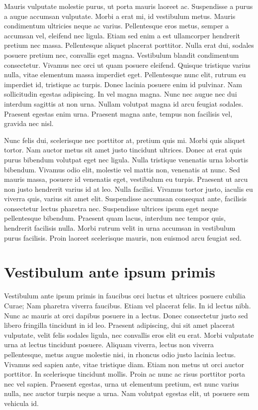 Mauris vulputate molestie purus, ut porta mauris laoreet ac.
Suspendisse a purus a augue accumsan vulputate.
Morbi a erat mi, id vestibulum metus.
Mauris condimentum ultricies neque ac varius.
Pellentesque eros metus, semper a accumsan vel, eleifend nec ligula.
Etiam sed enim a est ullamcorper hendrerit pretium nec massa.
Pellentesque aliquet placerat porttitor.
Nulla erat dui, sodales posuere pretium nec, convallis eget magna.
Vestibulum blandit condimentum consectetur.
Vivamus nec orci ut quam posuere eleifend.
Quisque tristique varius nulla, vitae elementum massa imperdiet eget.
Pellentesque nunc elit, rutrum eu imperdiet id, tristique ac turpis.
Donec lacinia posuere enim id pulvinar.
Nam sollicitudin egestas adipiscing.
In vel magna magna.
Nunc nec augue nec dui interdum sagittis at non urna.
Nullam volutpat magna id arcu feugiat sodales.
Praesent egestas enim urna.
Praesent magna ante, tempus non facilisis vel, gravida nec nisl.

Nunc felis dui, scelerisque nec porttitor at, pretium quis mi.
Morbi quis aliquet tortor.
Nam auctor metus sit amet justo tincidunt ultrices.
Donec at erat quis purus bibendum volutpat eget nec ligula.
Nulla tristique venenatis urna lobortis bibendum.
Vivamus odio elit, molestie vel mattis non, venenatis at nunc.
Sed mauris massa, posuere id venenatis eget, vestibulum eu turpis.
Praesent ut arcu non justo hendrerit varius id at leo.
Nulla facilisi.
Vivamus tortor justo, iaculis eu viverra quis, varius sit amet elit.
Suspendisse accumsan consequat ante, facilisis consectetur lectus pharetra nec.
Suspendisse ultrices ipsum eget neque pellentesque bibendum.
Praesent quam lacus, interdum nec tempor quis, hendrerit facilisis nulla.
Morbi rutrum velit in urna accumsan in vestibulum purus facilisis.
Proin laoreet scelerisque mauris, non euismod arcu feugiat sed.

\section{Vestibulum ante ipsum primis}
Vestibulum ante ipsum primis in faucibus orci luctus et ultrices posuere cubilia Curae; Nam pharetra viverra faucibus.
Etiam vel placerat felis.
In id lectus nibh.
Nunc ac mauris at orci dapibus posuere in a lectus.
Donec consectetur justo sed libero fringilla tincidunt in id leo.
Praesent adipiscing, dui sit amet placerat vulputate, velit felis sodales ligula, nec convallis eros elit eu erat.
Morbi vulputate urna at lectus tincidunt posuere.
Aliquam viverra, lectus non viverra pellentesque, metus augue molestie nisi, in rhoncus odio justo lacinia lectus.
Vivamus sed sapien ante, vitae tristique diam.
Etiam non metus ut orci auctor porttitor.
In scelerisque tincidunt mollis.
Proin ac nunc ac risus porttitor porta nec vel sapien.
Praesent egestas, urna ut elementum pretium, est nunc varius nulla, nec auctor turpis neque a urna.
Nam volutpat egestas elit, ut posuere sem vehicula id.

